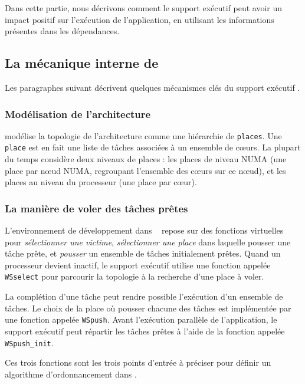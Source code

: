 \documentclass[parallelisme]{compas2016}
\begin{document}
Dans cette partie, nous décrivons comment le support exécutif peut avoir un impact
positif sur l'exécution de l'application, en utilisant les informations présentes
dans les dépendances.


\vspace*{-1ex}
\subsection{La mécanique interne de \kaapi}

Les paragraphes suivant décrivent quelques mécanismes clés du support exécutif \kaapi.


\vspace*{-1ex}
\subsubsection{Modélisation de l'architecture}

\kaapi modélise la topologie de l'architecture comme une hiérarchie de \verb/places/.
Une \verb/place/ est en fait une liste de tâches associées à un ensemble de cœurs.
La plupart du temps \kaapi considère deux niveaux de places : les places de niveau
NUMA (une place par nœud NUMA, regroupant l'ensemble des cœurs sur ce nœud),
et les places au niveau du processeur (une place par cœur).


\subsubsection{La manière de voler des tâches prêtes}

L'environnement de développement dans \kaapi~\cite{Bleuse2014} repose sur des fonctions
virtuelles pour \textit{sélectionner une victime}, \textit{sélectionner une place} dans
laquelle pousser une tâche prête, et \textit{pousser} un ensemble de tâches initialement
prêtes.
Quand un processeur devient inactif, le support exécutif utilise une fonction appelée
\verb/WSselect/ pour parcourir la topologie à la recherche d'une place à voler.

La complétion d'une tâche peut rendre possible l'exécution d'un ensemble de tâches.
Le choix de la place où pousser chacune des tâches est implémentée par une fonction
appelée \verb/WSpush/.
Avant l'exécution parallèle de l'application, le support exécutif peut répartir
les tâches prêtes à l'aide de la fonction appelée \verb/WSpush_init/.

Ces trois fonctions sont les trois points d'entrée à préciser pour définir
un algorithme d'ordonnancement dans \kaapi.
\end{document}
